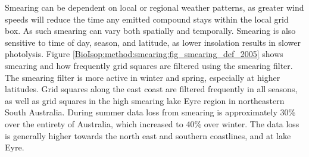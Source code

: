     Smearing can be dependent on local or regional weather patterns, as greater wind speeds will reduce the time any emitted compound stays within the local grid box.
    As such smearing can vary both spatially and temporally.
    Smearing is also sensitive to time of day, season, and latitude, as lower insolation results in slower photolysis.
    Figure \ref{BioIsop:method:smearing:fig_smearing_def_2005} shows smearing and how frequently grid squares are filtered using the smearing filter.
    The smearing filter is more active in winter and spring, especially at higher latitudes.
    Grid squares along the east coast are filtered frequently in all seasons, as well as grid squares in the high smearing lake Eyre region in northeastern South Australia.
    During summer data loss from smearing is approximately 30\% over the entirety of Australia, which increased to 40\% over winter.
    The data loss is generally higher towards the north east and southern coastlines, and at lake Eyre.
    
    
    
